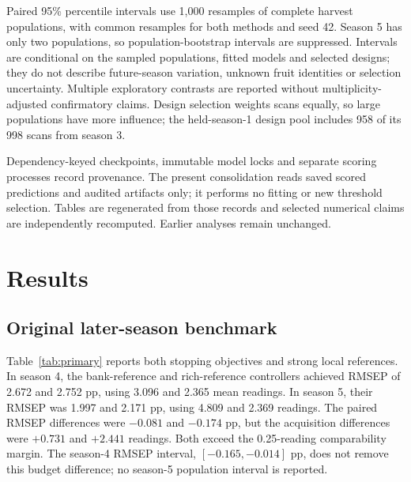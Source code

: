 \documentclass[11pt,a4paper]{article}
\begin{document}
Paired 95\% percentile intervals use 1,000 resamples of complete harvest populations, with common resamples for both methods and seed 42. Season 5 has only two populations, so population-bootstrap intervals are suppressed. Intervals are conditional on the sampled populations, fitted models and selected designs; they do not describe future-season variation, unknown fruit identities or selection uncertainty. Multiple exploratory contrasts are reported without multiplicity-adjusted confirmatory claims. Design selection weights scans equally, so large populations have more influence; the held-season-1 design pool includes 958 of its 998 scans from season 3.

Dependency-keyed checkpoints, immutable model locks and separate scoring processes record provenance. The present consolidation reads saved scored predictions and audited artifacts only; it performs no fitting or new threshold selection. Tables are regenerated from those records and selected numerical claims are independently recomputed. Earlier analyses remain unchanged.

\section{Results}
\subsection{Original later-season benchmark}
Table~\ref{tab:primary} reports both stopping objectives and strong local references. In season 4, the bank-reference and rich-reference controllers achieved RMSEP of 2.672 and 2.752 pp, using 3.096 and 2.365 mean readings. In season 5, their RMSEP was 1.997 and 2.171 pp, using 4.809 and 2.369 readings. The paired RMSEP differences were $-0.081$ and $-0.174$ pp, but the acquisition differences were $+0.731$ and $+2.441$ readings. Both exceed the 0.25-reading comparability margin. The season-4 RMSEP interval, $[-0.165,-0.014]$ pp, does not remove this budget difference; no season-5 population interval is reported.

\begin{table}[tbp]\centering\small
\caption{Original seed-42 benchmark on seasons 4--5 from the same dataset. RMSEP is in dry-matter pp. ``Readings'' are simulated finite-band acquisitions; a rich-spectrum model uses 103 spectral variables, which are not equivalent physical LED pulses. Static four-channel models can use different subsets from a four-reading adaptive prefix.}\label{tab:primary}

\end{table}
\end{document}
